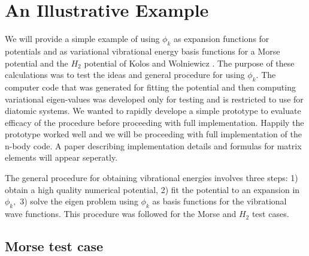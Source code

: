 \documentclass[12pt,thmsa]{article}
\begin{document}
\section{An Illustrative Example}

We will provide a simple example of using $\phi _k$ as expansion functions
for potentials and as variational vibrational energy basis functions for a
Morse potential and the $H_2$ potential of Kolos and Wolniewicz\cite{Kolos65}%
. The purpose of these calculations was to test the ideas and general
procedure for using $\phi _k$. The computer code that was generated for
fitting the potential and then computing variational eigen-values was
developed only for testing and is restricted to use for diatomic systems. We
wanted to rapidly develope a simple prototype to evaluate efficacy of the
procedure before proceeding with full implementation. Happily the prototype
worked well and we will be proceeding with full implementation of the n-body
code. A paper describing implementation details and formulas for matrix
elements will appear seperatly.

The general procedure for obtaining vibrational energies involves three
steps: 1) obtain a high quality numerical potential, 2) fit the potential to
an expansion in $\phi _k,$ 3) solve the eigen problem using $\phi _k$ as
basis functions for the vibrational wave functions. This procedure was
followed for the Morse and $H_2$ test cases.

\subsection{Morse test case}
\end{document}

